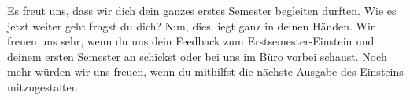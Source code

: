 Es freut uns, dass wir dich dein ganzes erstes Semester begleiten durften.
Wie es jetzt weiter geht fragst du dich?
Nun, dies liegt ganz in deinen Händen.
Wir freuen uns sehr, wenn du uns dein Feedback zum Erstsemester-Einstein und deinem ersten Semester an  schickst oder bei uns im Büro vorbei schaust.
Noch mehr würden wir uns freuen, wenn du mithilfst die nächste Ausgabe des Einsteins mitzugestalten.
